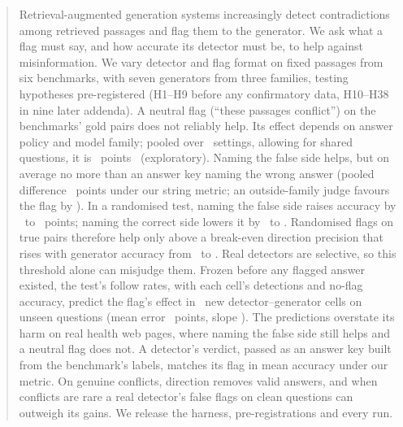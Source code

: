 \begin{abstract}
Retrieval-augmented generation systems increasingly detect contradictions among retrieved passages and flag them to
the generator. We ask what a flag must say, and how accurate its detector must be, to help against
misinformation. We vary detector and flag format on fixed passages from six benchmarks, with seven generators from three
families, testing hypotheses pre-registered (H1--H9 before any confirmatory data,
H10--H38 in nine later addenda). A neutral flag (``these passages conflict'') on the benchmarks' gold pairs does not reliably
help. Its effect depends on answer policy and model family; pooled over \neuMlK\ settings, allowing
for shared questions, it is \neuMlMu\ points \neuMlCI\ (exploratory). Naming the false side helps, but on average no more than
an answer key naming the wrong answer (pooled difference \PoolTwentyThree\ points under our string metric; an outside-family judge favours the flag by \jdTwentyThreeJ). In a
randomised test, naming the false side raises accuracy by \hThirtyOneAMin\ to \hThirtyOneAMax\ points; naming the correct side lowers it by
\ahThirtyOneBMax\ to \ahThirtyOneBMin. Randomised flags on true pairs therefore help only above a break-even direction
precision that rises with generator accuracy from \beMin\ to \beMax. Real detectors are selective, so this
threshold alone can misjudge them. Frozen before any flagged answer existed, the test's follow rates, with each cell's detections and no-flag accuracy,
predict the flag's effect in \frN\ new detector--generator cells on unseen questions (mean error \frMae\ points, slope \frSlope).
The predictions overstate its harm on real health web pages, where
naming the false side still helps and a neutral flag does not. A detector's verdict, passed as an answer key built from the benchmark's labels, matches its flag in mean
accuracy under our metric. On genuine
conflicts, direction removes valid answers, and when conflicts are rare a real detector's false flags on clean
questions can outweigh its gains. We release the harness, pre-registrations and every run.
\end{abstract}
